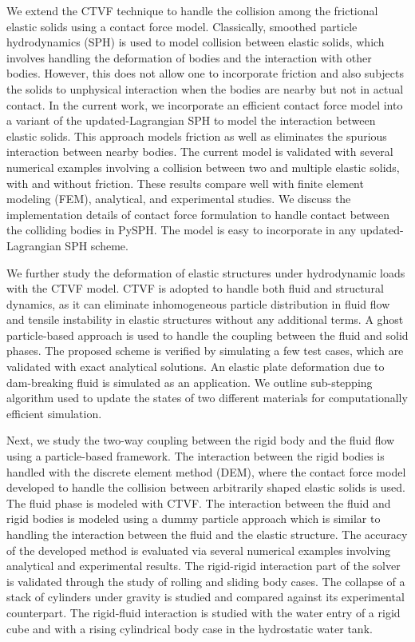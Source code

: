 \begin{Abstract}
  We extend the CTVF technique to handle the collision among the frictional
  elastic solids using a contact force model. Classically, smoothed particle
  hydrodynamics (SPH) is used to model collision between elastic solids, which
  involves handling the deformation of bodies and the interaction with other
  bodies. However, this does not allow one to incorporate friction and also
  subjects the solids to unphysical interaction when the bodies are nearby but
  not in actual contact. In the current work, we incorporate an efficient
  contact force model into a variant of the updated-Lagrangian SPH to model the
  interaction between elastic solids. This approach models friction as well as
  eliminates the spurious interaction between nearby bodies. The current model
  is validated with several numerical examples involving a collision between two
  and multiple elastic solids, with and without friction. These results compare
  well with finite element modeling (FEM), analytical, and experimental studies.
  We discuss the implementation details of contact force formulation to handle contact
  between the colliding bodies in PySPH. The model is easy to incorporate in any
  updated-Lagrangian SPH scheme.


  We further study the deformation of elastic structures under hydrodynamic
  loads with the CTVF model. CTVF is adopted to handle both fluid and structural
  dynamics, as it can eliminate inhomogeneous particle distribution in fluid
  flow and tensile instability in elastic structures without any additional
  terms. A ghost particle-based approach is used to handle the coupling between
  the fluid and solid phases. The proposed scheme is verified by simulating a
  few test cases, which are validated with exact analytical solutions. An
  elastic plate deformation due to dam-breaking fluid is simulated as an
  application. We outline sub-stepping algorithm used to update the states of
  two different materials for computationally efficient simulation.

  Next, we study the two-way coupling between the rigid body and the fluid flow
  using a particle-based framework. The interaction between the rigid bodies is
  handled with the discrete element method (DEM), where the contact force model
  developed to handle the collision between arbitrarily shaped elastic solids is
  used. The fluid phase is modeled with CTVF. The interaction between the fluid
  and rigid bodies is modeled using a dummy particle approach which is similar
  to handling the interaction between the fluid and the elastic structure. The
  accuracy of the developed method is evaluated via several numerical examples
  involving analytical and experimental results. The rigid-rigid interaction
  part of the solver is validated through the study of rolling and sliding body
  cases. The collapse of a stack of cylinders under gravity is studied and
  compared against its experimental counterpart. The rigid-fluid interaction is
  studied with the water entry of a rigid cube and with a rising cylindrical body
  case in the hydrostatic water tank.


\end{Abstract}
